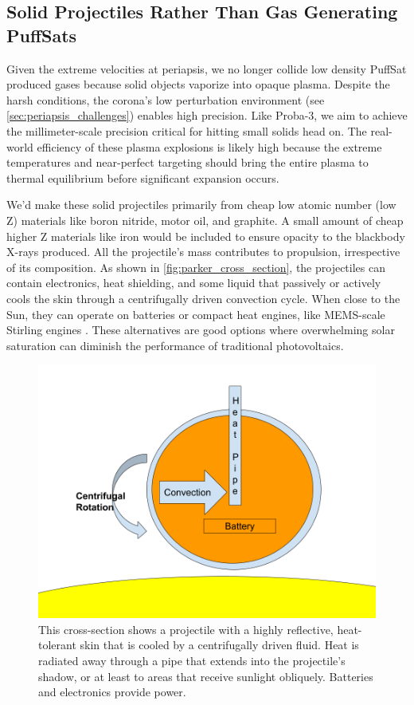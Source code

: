 \documentclass{article}
\begin{document}
{\subsection{Solid Projectiles Rather Than Gas Generating PuffSats}\label{sec:solid_PuffSats}
Given the extreme velocities at periapsis, we no longer collide low density PuffSat produced gases because solid objects vaporize into opaque plasma.   Despite the harsh conditions, the corona's low perturbation environment (see \autoref{sec:periapsis_challenges}) enables high precision.  Like Proba-3, we aim to achieve the millimeter-scale precision critical for hitting small solids head on.   The real-world efficiency of these plasma explosions is likely high because the extreme temperatures and near-perfect targeting should bring the entire plasma to thermal equilibrium before significant expansion occurs.

We'd make these solid projectiles primarily from cheap low atomic number (low Z) materials like boron nitride, motor oil, and graphite.  A small amount of cheap higher Z materials like iron would be included to ensure opacity to the blackbody X-rays produced.  
All the projectile's mass contributes to propulsion, irrespective of its composition.  As shown in \autoref{fig:parker_cross_section}, the projectiles can contain electronics, heat shielding, and some liquid that passively or actively cools the skin through a centrifugally driven convection cycle.    When close to the Sun, they can operate on batteries or compact heat engines, like MEMS-scale Stirling engines \cite{mems_stirling_engine}. These alternatives are good options  where overwhelming solar saturation can diminish the performance of traditional photovoltaics.    

\begin{figure}
    \centering
    \includegraphics[width=0.5\linewidth]{images/Parker Projectile Cross Section.png}
    \caption{This cross-section shows a projectile with a highly reflective, heat-tolerant skin that is cooled by a centrifugally driven fluid. Heat is radiated away through a pipe that extends into the projectile's shadow, or at least to areas that receive sunlight obliquely. Batteries and electronics provide power.}
    \label{fig:parker_cross_section}
\end{figure}

}
\end{document}
